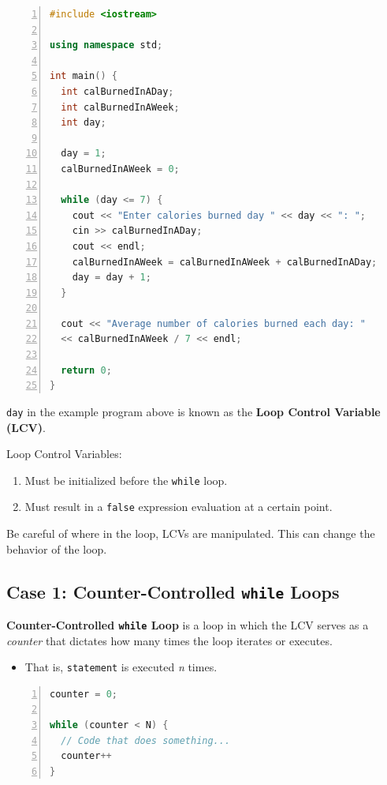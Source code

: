 \documentclass{article}
\begin{document}
\begin{lstlisting}[language=C++, caption={\texttt{while} Loop Example Program}, numbers=left]
#include <iostream>

using namespace std;

int main() {
  int calBurnedInADay;
  int calBurnedInAWeek;
  int day;

  day = 1;
  calBurnedInAWeek = 0;

  while (day <= 7) {
    cout << "Enter calories burned day " << day << ": ";
    cin >> calBurnedInADay;
    cout << endl;
    calBurnedInAWeek = calBurnedInAWeek + calBurnedInADay;
    day = day + 1;
  }
   
  cout << "Average number of calories burned each day: "
  << calBurnedInAWeek / 7 << endl;

  return 0;
}
\end{lstlisting}

\texttt{day} in the example program above is known as the \textbf{Loop Control
Variable (LCV)}.

\vspace{8pt}
Loop Control Variables:

\begin{enumerate}
    \item Must be initialized before the \texttt{while} loop.
    \item Must result in a \texttt{false} expression evaluation at a certain point.
\end{enumerate}

Be careful of where in the loop, LCVs are manipulated. This can change the behavior of the loop.

\subsection{Case 1: Counter-Controlled \texttt{while} Loops}
\textbf{Counter-Controlled \texttt{while} Loop} is a loop in
which the LCV serves as a \textit{counter} that dictates how many times the loop iterates or executes.
\begin{itemize}
  \item That is, \texttt{statement} is executed \textit{n} times.
\end{itemize}

\begin{lstlisting}[language=C++, caption={Counter-Controlled \texttt{while} Loop
  Example}, numbers=left]
counter = 0;

while (counter < N) {
  // Code that does something...
  counter++
}
\end{lstlisting}
\end{document}
